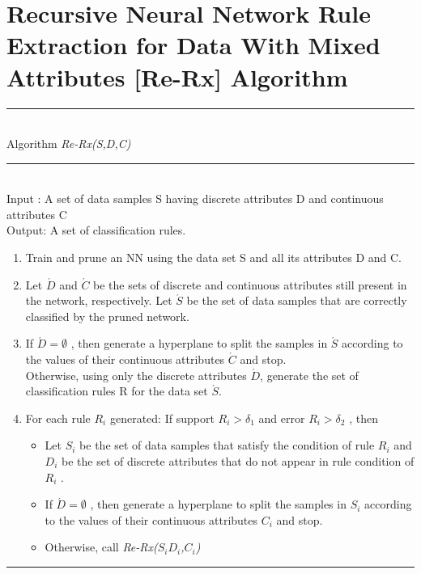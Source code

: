 \documentclass[a4paper,14pt,onecolumn]{article}
\begin{document}
\section{Recursive Neural Network Rule Extraction
for Data With Mixed Attributes [Re-Rx] Algorithm}
\rule{6.3in}{.02in}
 \\Algorithm \emph{Re-Rx(S,D,C)}\\
\rule{6.3in}{.02in}
\\Input  : A set of data samples S having discrete attributes
             D and continuous attributes C\\
Output: A set of classification rules.\\
\begin{enumerate}
\item Train and prune an NN using the data set S and all its attributes D and C.
\item Let $\acute{D}$ and $\acute{C}$ be the sets of discrete and continuous attributes still present in the network, respectively. Let $\acute{S}$ be the set of data samples that are correctly classified by the pruned network. 
\item If $\acute{D} = \emptyset$ , then generate a hyperplane to split the samples
in $\acute{S}$ according to the values of their continuous attributes $\acute{C}$
and stop.\\
 Otherwise, using only the discrete attributes $\acute{D}$, generate the
set of classification rules R for the data set $\acute{S}$.
\item For each rule ${R}_i$ generated:
If support ${R}_i > \delta_1$ and error  ${R}_i > \delta_2$ , then
\begin{itemize}
\item Let ${S}_i$ be the set of data samples that satisfy the condition
of rule ${R}_i$  and ${D}_i$  be the set of discrete attributes that do not
appear in rule condition of ${R}_i$ .
\item If $\acute{D} = \emptyset$ , then generate a hyperplane to split the samples
in ${S}_i$ according to the values of their continuous attributes ${C}_i$
and stop.
\item Otherwise, call \emph{Re-Rx(${S}_i$${D}_i$,${C}_i$)}
\end{itemize}
\end{enumerate}
\rule{6.3in}{.02in}
\end{document}
